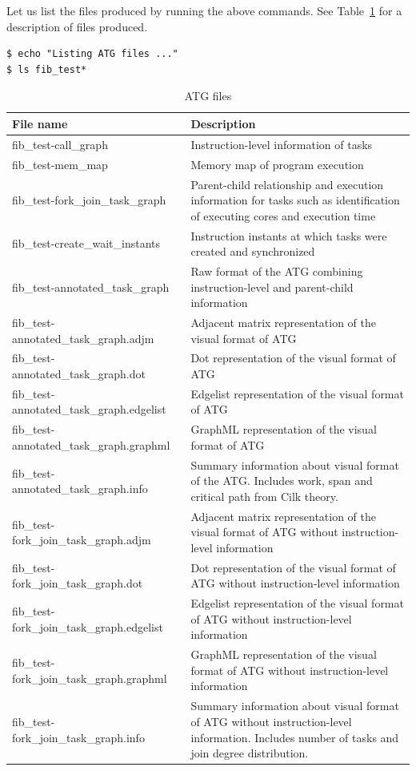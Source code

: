 \documentclass[11pt,a4paper,notitlepage]{article}
\begin{document}
Let us list the files produced by running the above commands. See Table~\ref{tab:atg-files} for a description of files produced.
\begin{lstlisting}[style=BashInputStyle]
$ echo "Listing ATG files ..."
$ ls fib_test*
\end{lstlisting}

\begin{table}[!htb]
\begin{tabular}{|p{5.5cm}|p{7cm}|}
\hline
\textbf{File name} & \textbf{Description} \\ \hline
fib\_test-call\_graph & Instruction-level information of tasks \\ \hline
fib\_test-mem\_map & Memory map of program execution  \\ \hline
fib\_test-fork\_join\_task\_graph & Parent-child relationship and execution information for tasks such as identification of executing cores and execution time \\ \hline
fib\_test-create\_wait\_instants & Instruction instants at which tasks were created and synchronized \\ \hline
fib\_test-annotated\_task\_graph & Raw format of the ATG combining instruction-level and parent-child information \\ \hline
fib\_test-annotated\_task\_graph.adjm & Adjacent matrix representation of the visual format of ATG \\ \hline
fib\_test-annotated\_task\_graph.dot & Dot representation of the visual format of ATG \\ \hline
fib\_test-annotated\_task\_graph.edgelist & Edgelist representation of the visual format of ATG \\ \hline
fib\_test-annotated\_task\_graph.graphml & GraphML representation of the visual format of ATG \\ \hline
fib\_test-annotated\_task\_graph.info & Summary information about visual format of the ATG. Includes work, span and critical path from Cilk theory. \\ \hline
fib\_test-fork\_join\_task\_graph.adjm & Adjacent matrix representation of the visual format of ATG without instruction-level information \\ \hline
fib\_test-fork\_join\_task\_graph.dot & Dot representation of the visual format of ATG without instruction-level information \\ \hline
fib\_test-fork\_join\_task\_graph.edgelist & Edgelist representation of the visual format of ATG without instruction-level information \\ \hline
fib\_test-fork\_join\_task\_graph.graphml & GraphML representation of the visual format of ATG without instruction-level information \\ \hline
fib\_test-fork\_join\_task\_graph.info & Summary information about visual format of ATG without instruction-level information. Includes number of tasks and join degree distribution. \\ \hline
\end{tabular}
\caption{ATG files}
\label{tab:atg-files}
\end{table}
\end{document}
